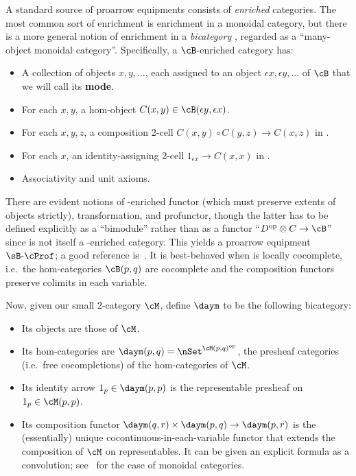 \documentclass{amsart}
\def\bprof{\sB\text{-}\cProf}
\let\extent\epsilon
\begin{document}
A standard source of proarrow equipments consists of \emph{enriched} categories.
The most common sort of enrichment is enrichment in a monoidal category, but there is a more general notion of enrichment in a \emph{bicategory} \cB, regarded as a ``many-object monoidal category''.
Specifically, a $\cB$-enriched category has:
\begin{itemize}
\item A collection of objects $x,y,\dots$, each assigned to an object $\extent x, \extent y, \dots$ of $\cB$ that we will call its \textbf{mode}.
\item For each $x,y$, a hom-object $C(x,y)\in \cB(\extent y, \extent x)$.
\item For each $x,y,z$, a composition 2-cell $C(x,y) \circ C(y,z)  \to C(x,z)$ in \cB.
\item For each $x$, an identity-assigning 2-cell $1_{\extent x}\to C(x,x)$ in \cB.
\item Associativity and unit axioms.
\end{itemize}
There are evident notions of \cB-enriched functor (which must preserve extents of objects strictly), transformation, and profunctor, though the latter has to be defined explicitly as a ``bimodule'' rather than as a functor ``$D\op\otimes C\to \cB$'' since \cB is not itself a \cB-enriched category.
This yields a proarrow equipment $\bprof$; a good reference is~\cite{bcsw:variation-enr}.
It is best-behaved when \cB is locally cocomplete, i.e.\ the hom-categories $\cB(p,q)$ are cocomplete and the composition functors preserve colimits in each variable.

Now, given our small 2-category $\cM$, define $\daym$ to be the following bicategory:
\begin{itemize}
\item Its objects are those of $\cM$.
\item Its hom-categories are $\daym(p,q) = \nSet^{\cM(p,q)\op}$, the presheaf categories (i.e.\ free cocompletions) of the hom-categories of $\cM$.
\item Its identity arrow $1_p\in \daym(p,p)$ is the representable presheaf on $1_p\in \cM(p,p)$.
\item Its composition functor $\daym(q,r) \times \daym(p,q) \to \daym(p,r)$ is the (essentially) unique cocontinuous-in-each-variable functor that extends the composition of $\cM$ on representables.
  It can be given an explicit formula as a convolution; see~\cite{day:closed} for the case of monoidal categories.
\end{itemize}
\end{document}
